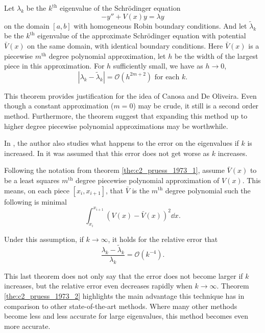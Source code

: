 \begin{theorem}[Pruess 1973]\label{the:c2_pruess_1973_1}
    Let $\lambda_k$ be the $k^\text{th}$ eigenvalue of the Schrödinger equation
    $$
        -y'' + V(x) y = \lambda y
    $$
    on the domain $[a, b]$ with homogeneous Robin boundary conditions. And let $\tilde{\lambda}_k$ be the $k^\text{th}$ eigenvalue of the approximate Schrödinger equation with potential $\bar{V}(x)$ on the same domain, with identical boundary conditions. Here $\bar{V}(x)$ is a piecewise $m^\text{th}$ degree polynomial approximation, let $h$ be the width of the largest piece in this approximation. For $h$ sufficiently small, we have as $h \to 0$,
    $$
        |\lambda_k - \tilde{\lambda}_k| = \mathcal{O}(h^{2m + 2}) \text{ for each $k$.}
    $$
\end{theorem}

This theorem provides justification for the idea of Canosa and De Oliveira. Even though a constant approximation ($m = 0$) may be crude, it still is a second order method. Furthermore, the theorem suggest that expanding this method up to higher degree piecewise polynomial approximations may be worthwhile.

In \cite{pruess_estimating_1973}, the author also studies what happens to the error on the eigenvalues if $k$ is increased. In \cite{canosa_new_1970} it was assumed that this error does not get worse as $k$ increases.

\begin{theorem}[Pruess 1973]\label{the:c2_pruess_1973_2}
    Following the notation from theorem \ref{the:c2_pruess_1973_1}, assume $\bar{V}(x)$ to be a least squares $m^\text{th}$ degree piecewise polynomial approximation of $V(x)$. This means, on each piece $[x_i, x_{i+1}]$, that $\bar{V}$ is the $m^\text{th}$ degree polynomial such the following is minimal
    $$
        \int_{x_i}^{x_{i+1}} \left(V(x) - \bar{V}(x)\right)^2 \dd x \text{.}
    $$

    Under this assumption, if $k \to \infty$, it holds for the relative error that
    $$
        \frac{\lambda_k - \tilde{\lambda}_k}{\lambda_k} = \mathcal{O}(k^{-4})\text{.}
    $$
\end{theorem}

This last theorem does not only say that the error does not become larger if $k$ increases, but the relative error even decreases rapidly when $k \to \infty$. Theorem \ref{the:c2_pruess_1973_2} highlights the main advantage this technique has in comparison to other state-of-the-art methods. Where many other methods become less and less accurate for large eigenvalues, this method becomes even more accurate.

